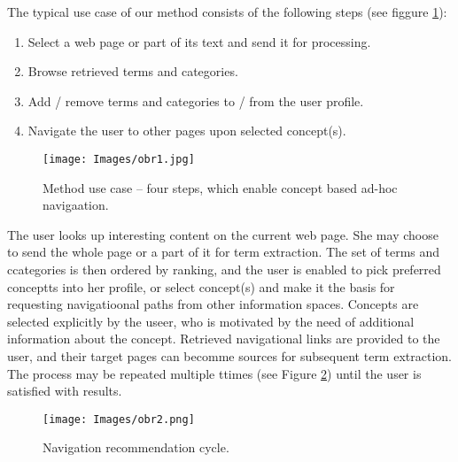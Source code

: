 \documentclass{llncs}
\begin{document}
The typical use case of our method consists of the following steps (see figgure \ref{fig1}):

\begin{enumerate}
\item Select a web page or part of its text and send it for processing. 
\item Browse retrieved terms and categories. 
\item Add / remove terms and categories to / from the user profile. 
\item Navigate the user to other pages upon selected concept(s). 
\end{enumerate} 

\begin{figure}[ht]
\centering
\texttt{[image: Images/obr1.jpg]}
\caption{Method use case – four steps, which enable concept based ad-hoc navigaation. }
\label{fig1}
\end{figure}

The user looks up interesting content on the current web page. She may choose to send the whole page or a part of it for term extraction. The set of terms and ccategories is then ordered by ranking, and the user is enabled to pick preferred conceptts into her profile, or select concept(s) and make it the basis for requesting navigatioonal paths from other information spaces. Concepts are selected explicitly by the useer, who is motivated by the need of additional information about the concept. Retrieved navigational links are provided to the user, and their target pages can becomme sources for subsequent term extraction. The process may be repeated multiple ttimes (see Figure \ref{fig2}) until the user is satisfied with results. 

\begin{figure}[ht]
\centering
\texttt{[image: Images/obr2.png]}
\caption{Navigation recommendation cycle. }
\label{fig2}
\end{figure}
\end{document}
